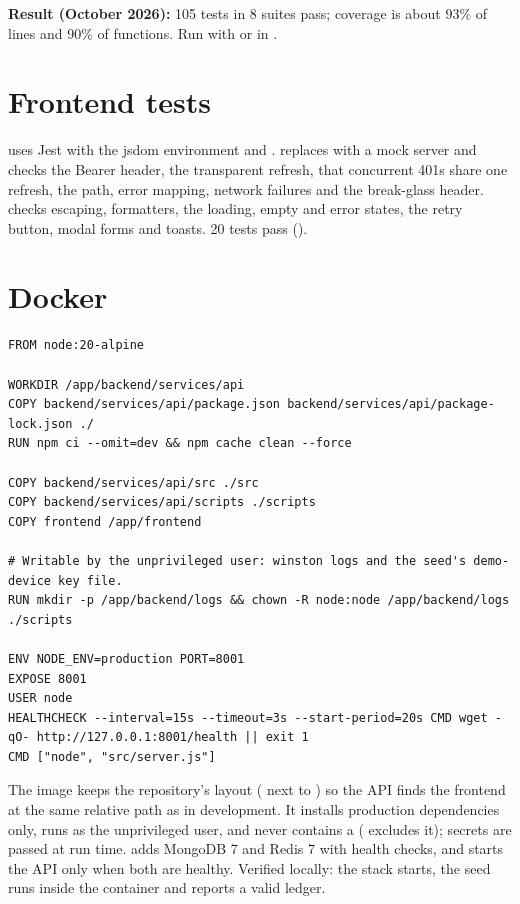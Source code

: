 \textbf{Result (October 2026):} 105 tests in 8 suites pass; coverage is about
93\% of lines and 90\% of functions. Run with
 or  in .

\section{Frontend tests}

 uses Jest with the jsdom environment and
.  replaces  with a mock
server and checks the Bearer header, the transparent refresh, that concurrent
401s share one refresh, the  path, error mapping, network
failures and the break-glass header.  checks escaping,
formatters, the loading, empty and error states, the retry button, modal forms
and toasts. 20 tests pass ().

\section{Docker}

\begin{lstlisting}[style=shell,caption={\file{Dockerfile}}]
FROM node:20-alpine

WORKDIR /app/backend/services/api
COPY backend/services/api/package.json backend/services/api/package-lock.json ./
RUN npm ci --omit=dev && npm cache clean --force

COPY backend/services/api/src ./src
COPY backend/services/api/scripts ./scripts
COPY frontend /app/frontend

# Writable by the unprivileged user: winston logs and the seed's demo-device key file.
RUN mkdir -p /app/backend/logs && chown -R node:node /app/backend/logs ./scripts

ENV NODE_ENV=production PORT=8001
EXPOSE 8001
USER node
HEALTHCHECK --interval=15s --timeout=3s --start-period=20s CMD wget -qO- http://127.0.0.1:8001/health || exit 1
CMD ["node", "src/server.js"]
\end{lstlisting}

The image keeps the repository's layout ( next to
) so the API finds the frontend at the same relative path as in
development. It installs production dependencies only, runs as the
unprivileged  user, and never contains a 
( excludes it); secrets are passed at run time.
 adds MongoDB 7 and Redis 7 with health checks, and
starts the API only when both are healthy. Verified locally: the stack starts,
the seed runs inside the container and  reports a valid
ledger.

